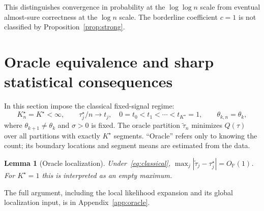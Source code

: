 \documentclass[pdflatex,sn-mathphys-num]{sn-jnl}
\newcommand{\Prob}{\mathbb P}
\newcommand{\taus}{\tau^\star}
\newcommand{\tol}{\widetilde\tau_n}
\newcommand{\Op}{O_{\Prob}}
\theoremstyle{thmstyleone}
\newtheorem{lemma}[theorem]{Lemma}
\theoremstyle{thmstyletwo}
\begin{document}
This distinguishes convergence in probability at the $\log\log n$ scale from
eventual almost-sure correctness at the $\log n$ scale. The borderline
coefficient $c=1$ is not classified by Proposition~\ref{prop:strong}.

\section{Oracle equivalence and sharp statistical consequences}\label{sec:oracle}

In this section impose the classical fixed-signal regime:
\begin{equation}\label{eq:classical}
K_n^\star=K^\star<\infty,\qquad
\taus_j/n\to t_j,\quad 0=t_0<t_1<\cdots<t_{K^\star}=1,
\qquad \theta_{k,n}=\theta_k,
\end{equation}
where $\theta_{k+1}\ne\theta_k$ and $\sigma>0$ is fixed.
The oracle partition $\tol$ minimizes $Q(\tau)$ over all partitions with
exactly $K^\star$ segments. ``Oracle'' refers only to knowing the count;
its boundary locations and segment means are estimated from the data.

\begin{lemma}[Oracle localization]\label{lem:oracle-tight}
Under~\eqref{eq:classical},
$\max_j|\widetilde\tau_j-\taus_j|=\Op(1)$.
For $K^\star=1$ this is interpreted as an empty maximum.
\end{lemma}
The full argument, including the local likelihood expansion and its
global localization input, is in Appendix~\ref{app:oracle}.
\end{document}
